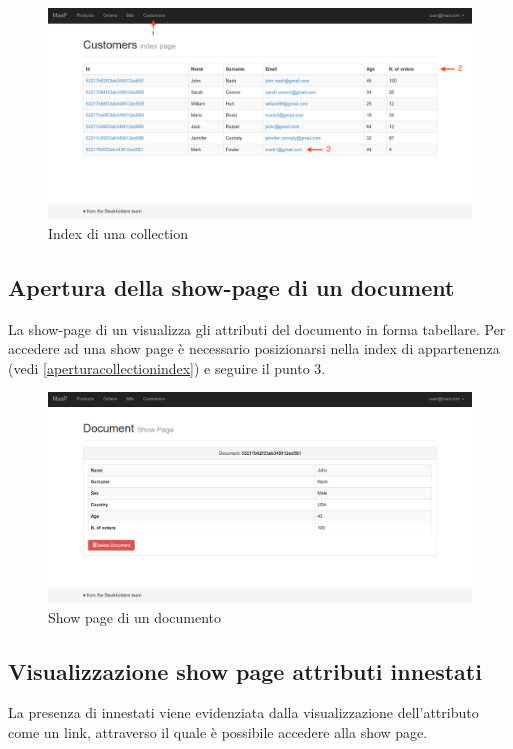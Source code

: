 	\begin{figure}[H]
	\label{fig:collection}
		\centering \includegraphics[width=1\textwidth]{img/collection.png}
	\caption{Index di una collection}
	\end{figure}
	

	\subsection{Apertura della show-page di un document} %
	\label{aperturashowpage}
	La show-page di un  visualizza gli attributi del documento in forma tabellare. Per accedere ad una show page è necessario posizionarsi nella  index di appartenenza (vedi \ref{aperturacollectionindex}) e seguire il punto 3.

	\begin{figure}[H]
	\label{fig:showpage}
		\centering \includegraphics[width=1\textwidth]{img/showpage.png}
	\caption{Show page di un documento}
	\end{figure}

	\subsection{Visualizzazione show page attributi innestati} %
	La presenza di  innestati viene evidenziata dalla visualizzazione dell'attributo come un link, attraverso il quale è possibile accedere alla show page. 


